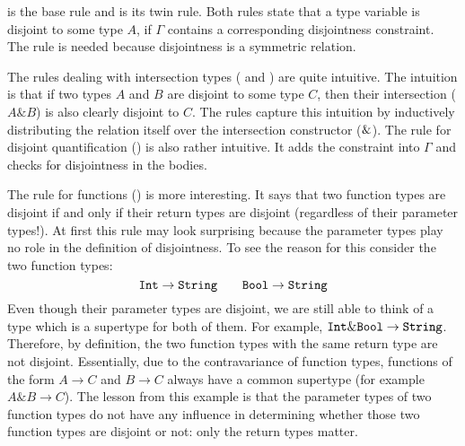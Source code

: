  is the base rule and
 is its twin rule. Both rules state that a
type variable is disjoint to some type $A$, if $\Gamma$ contains a
corresponding disjointness constraint. The 
rule is needed because disjointness is a symmetric relation.

The rules dealing with intersection types (
and ) are quite intuitive. The intuition is
that if two types $A$ and $B$ are disjoint to some type $C$, then
their intersection ($A\&B$) is also clearly disjoint to $C$.  The
rules capture this intuition by inductively distributing the relation
itself over the intersection constructor ($\&$). The rule
for disjoint quantification () is also
rather intuitive. It adds the constraint into $\Gamma$ and checks for
disjointness in the bodies.

The rule for functions () is more interesting. It says that two function
types are disjoint if and only if their return types are disjoint (regardless of
their parameter types!). At first this rule may look surprising
because the parameter types play no role in the definition of
disjointness. To see the reason for this consider the two function types:
\[ \texttt{Int} \to \texttt{String} \qquad \texttt{Bool} \to \texttt{String} \]
Even though their parameter types are disjoint, we are still able to think of a
type which is a supertype for both of them. For example, $ \texttt{Int} \& \texttt{Bool}
\to \texttt{String} $. Therefore, by definition, the two function types with
the same return type are not
disjoint. Essentially, due to the contravariance of function types,
functions of the form $A \to C$ and $B \to C$ always have a common
supertype (for example $A \& B \to C$).
The lesson from this example is that the parameter types of two
function types do not have any influence in determining whether those two function
types are disjoint or not: only the return types matter.

\begin{comment}
The rule for disjoint quantification (\reflabel{\labeldisforall}) . Consider the following two types:
\[ (\forall (\alpha * \tyint).~\tyint \& \alpha) \qquad (\forall (\alpha * \tychar). ~\tychar \& \alpha) \]
The question is under which conditions are those two types disjoint.
In the first type $\alpha$ cannot be instantiated with $\tyint$ and in
the second case $\alpha$ cannot be instantiated with $\tychar$.
Therefore we can see that for the two bodies to be considered
disjoint, $\alpha$ cannot be instantiated with either $\tyint$ or
$\tychar$. The rule for disjoint quantification captures this fact by
requiring the bodies of disjoint quantification to be checked for
disjointness under both constraints.
\end{comment}

